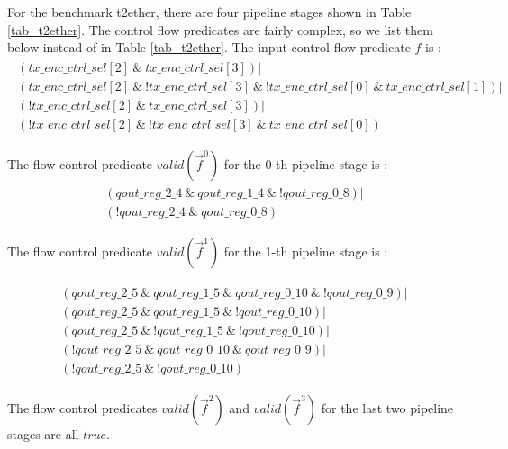 \documentclass[conference]{IEEEtran}
\begin{document}
For the benchmark t2ether,
there are four pipeline stages shown in Table \ref{tab_t2ether}.
The control flow predicates are fairly complex, 
so we list them below instead of in Table \ref{tab_t2ether}.
The input control flow predicate $f$ is :
\begin{multline}
\begin{array}{l}
( tx\_enc\_ctrl\_sel[2]~\&~tx\_enc\_ctrl\_sel[3] ) | \\
( tx\_enc\_ctrl\_sel[2]~\&~!tx\_enc\_ctrl\_sel[3]~\&~!tx\_enc\_ctrl\_sel[0]~\&~tx\_enc\_ctrl\_sel[1] ) | \\
( !tx\_enc\_ctrl\_sel[2]~\&~tx\_enc\_ctrl\_sel[3] ) | \\
( !tx\_enc\_ctrl\_sel[2]~\&~!tx\_enc\_ctrl\_sel[3]~\&~tx\_enc\_ctrl\_sel[0] )
\end{array}
\end{multline}

The flow control predicate $valid(\vec{f}^0)$ for the 0-th pipeline stage is :
\begin{multline}
\begin{array}{l}
( qout\_reg\_2\_4~\&~qout\_reg\_1\_4~\&~!qout\_reg\_0\_8) | \\
( !qout\_reg\_2\_4~\&~qout\_reg\_0\_8)
\end{array}
\end{multline}

The flow control predicate $valid(\vec{f}^1)$ for the 1-th pipeline stage is :

\begin{multline}
\begin{array}{l}
( qout\_reg\_2\_5~\&~qout\_reg\_1\_5~\&~qout\_reg\_0\_10~\&~!qout\_reg\_0\_9) | \\
( qout\_reg\_2\_5~\&~qout\_reg\_1\_5~\&~!qout\_reg\_0\_10) | \\
( qout\_reg\_2\_5~\&~!qout\_reg\_1\_5~\&~!qout\_reg\_0\_10) | \\
( !qout\_reg\_2\_5~\&~qout\_reg\_0\_10~\&~qout\_reg\_0\_9) | \\
( !qout\_reg\_2\_5~\&~!qout\_reg\_0\_10)
\end{array}
\end{multline}


The flow control predicates $valid(\vec{f}^2)$ and $valid(\vec{f}^3)$ for the last two pipeline stages are all $true$.
\end{document}
